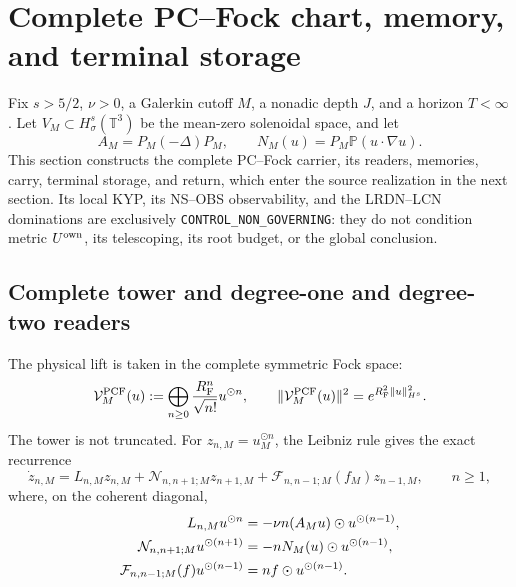 \section{Complete PC--Fock chart, memory, and terminal storage}
\label{sec:ns-pcf-prospective-construction}

Fix \(s>5/2\), \(\nu>0\), a Galerkin cutoff \(M\), a nonadic depth \(J\), and a horizon \(T<\infty\). Let \(V_M\subset H^s_\sigma(\mathbb T^3)\) be the mean-zero solenoidal space, and let
\begin{equation}
 A_M=P_M(-\Delta)P_M,
 \qquad
 N_M(u)=P_M\mathbb P(u\cdot\nabla u).
 \label{eq:ns-import-galerkin-operators}
\end{equation}
This section constructs the complete PC--Fock carrier, its readers, memories, carry, terminal storage, and return, which enter the source realization in the next section. Its local KYP, its NS--OBS observability, and the LRDN--LCN dominations are exclusively \texttt{CONTROL\_NON\_GOVERNING}: they do not condition metric \(U^{\rm own}\), its telescoping, its root budget, or the global conclusion.

\subsection{Complete tower and degree-one and degree-two readers}

The physical lift is taken in the complete symmetric Fock space:
\begin{equation}
 \mathcal V_M^{\rm PCF}(u)
 :=\bigoplus_{n\ge0}\frac{R_{\rm F}^n}{\sqrt{n!}}u^{\odot n},
 \qquad
 \|\mathcal V_M^{\rm PCF}(u)\|^2
 =e^{R_{\rm F}^2\|u\|_{H^s}^2}.
 \label{eq:ns-import-pcf-lift}
\end{equation}
The tower is not truncated. For \(z_{n,M}=u_M^{\odot n}\), the Leibniz rule gives the exact recurrence
\begin{equation}
 \dot z_{n,M}
 =L_{n,M}z_{n,M}
 +\mathcal N_{n,n+1;M}z_{n+1,M}
 +\mathcal F_{n,n-1;M}(f_M)z_{n-1,M},
 \qquad n\ge1,
 \label{eq:ns-import-carleman-all-degrees}
\end{equation}
where, on the coherent diagonal,
\begin{align}
 L_{n,M}u^{\odot n}
 &=-\nu n(A_Mu)\odot u^{\odot(n-1)}, \notag\\
 \mathcal N_{n,n+1;M}u^{\odot(n+1)}
 &=-nN_M(u)\odot u^{\odot(n-1)}, \notag\\
 \mathcal F_{n,n-1;M}(f)u^{\odot(n-1)}
 &=nf\odot u^{\odot(n-1)}.
 \label{eq:ns-import-carleman-blocks}
\end{align}


